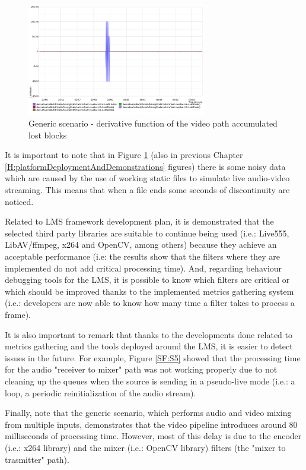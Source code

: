 \begin{figure}[!htb]
\begin{center}
\includegraphics[width=0.70\textwidth]{./images/testAVMix/AVMixVideoLostBlocsDerivative.png}
\caption{Generic scenario - derivative function of the video path accumulated lost blocks}
\label{F:gsvpalbd}
\end{center}
\end{figure}

It is important to note that in Figure \ref{F:gsvpalbd} (also in previous Chapter \ref{H:platformDeploymentAndDemonstrations} figures) there is some noisy data which are caused by the use of working static files to simulate live audio-video streaming. This means that when a file ends some seconds of discontinuity are noticed.

Related to LMS framework development plan, it is demonstrated that the selected third party libraries are suitable to continue being used (i.e.: Live555, LibAV/ffmpeg, x264 and OpenCV, among others) because they achieve an acceptable performance (i.e: the results show that the filters where they are implemented do not add critical processing time). And, regarding behaviour debugging tools for the LMS, it is possible to know which filters are critical or which should be improved thanks to the implemented metrics gathering system (i.e.: developers are now able to know how many time a filter takes to process a frame).

It is also important to remark that thanks to the developments done related to metrics gathering and the tools deployed around the LMS, it is easier to detect issues in the future. For example, Figure \ref{SF:S5} showed that the processing time for the audio "receiver to mixer" path was not working properly due to not cleaning up the queues when the source is sending in a pseudo-live mode (i.e.: a loop, a periodic reinitialization of the audio stream).

Finally, note that the generic scenario, which performs audio and video mixing from multiple inputs, demonstrates that the video pipeline introduces around 80 milliseconds of processing time. However, most of this delay is due to the encoder (i.e.: x264 library) and the mixer (i.e.: OpenCV library) filters (the "mixer to trasmitter" path).

